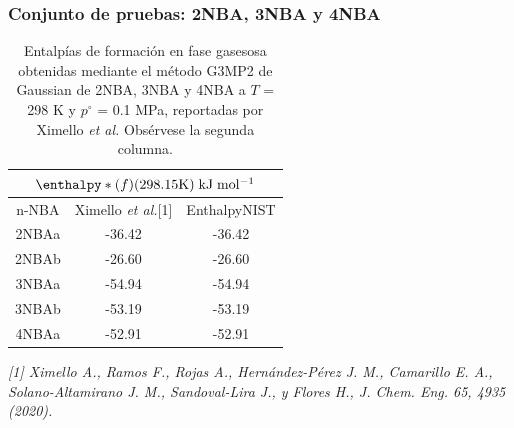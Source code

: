 \documentclass{beamer}
\begin{document}

\begin{frame}
\frametitle{Conjunto de pruebas: 2NBA, 3NBA y 4NBA}
\begin{table}[H]
\centering
\begin{tabular}{|c|c|c|}
\hline
	\multicolumn{3}{||c||}{$\enthalpy*(f){}(298.15 \mathrm{K})\; \mathrm{kJ\;mol^{-1}}$}\\
\hline
\hline
	n-NBA & Ximello \textit{et al.}[1] & EnthalpyNIST\\ 
\hline 
2NBAa & -36.42 & -36.42\\
\hline
2NBAb & -26.60 & -26.60\\ 
\hline 
3NBAa & -54.94 & -54.94\\
\hline
3NBAb & -53.19 & -53.19\\ 
\hline 
4NBAa & -52.91 & -52.91\\ 
\hline  
\end{tabular} 
	\caption{Entalpías de formación en fase gasesosa obtenidas mediante el método G3MP2 de Gaussian de 2NBA, 3NBA y 4NBA a $T$ = 298 K y $p^{\circ}$ = 0.1 MPa, reportadas por Ximello \textit{et al.} Obsérvese la segunda columna.}
\label{Ximello-table-2}
\end{table}
\textit{\tiny{[1] Ximello A., Ramos F., Rojas A., Hernández-Pérez J. M., Camarillo E. A., Solano-Altamirano J. M., Sandoval-Lira J., y Flores H., J. Chem. Eng. 65, 4935 (2020).}}
\end{frame}
\end{document}
